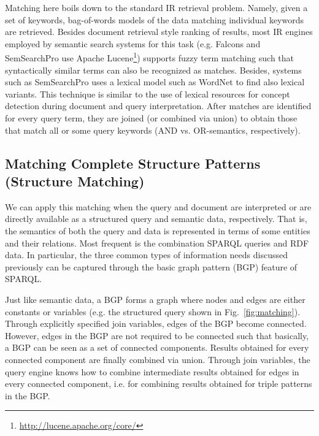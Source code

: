 Matching here boils down to the standard IR retrieval problem. Namely, given a set of keywords, bag-of-words models of the data matching individual keywords are retrieved. Besides document retrieval style ranking of results, most IR engines employed by semantic search systems for this task (e.g. Falcons and SemSearchPro use Apache Lucene\footnote{\url{http://lucene.apache.org/core/}}) supports fuzzy term matching such that syntactically similar terms can also be recognized as matches. Besides, systems such as SemSearchPro uses a lexical model such as WordNet to find also lexical variants. This technique is similar to the use of lexical resources for concept detection during document and query interpretation. After matches are identified for every query term, they are joined (or combined via union) to obtain those that match all or some query keywords (AND vs. OR-semantics, respectively).
 

\subsection{Matching Complete Structure Patterns (Structure Matching)} 
	 We can apply this matching when the query and document are interpreted or are directly available as a structured query and semantic data, respectively. That is, the semantics of both the query and data is represented in terms of some entities and their relations. Most frequent is the combination SPARQL queries and RDF data. In particular, the three common types of information needs discussed previously can be captured through the basic graph pattern (BGP) feature of SPARQL. 
	
	Just like semantic data, a BGP forms a graph where nodes and edges are either constants or variables (e.g. the structured query shown in Fig.~\ref{fig:matching}). Through explicitly specified join variables, edges of the BGP become connected. However, edges in the BGP are not required to be connected such that basically, a BGP can be seen as a set of connected components. Results obtained for every connected component are finally combined via union. Through join variables, the query engine knows how to combine intermediate results obtained for edges in every connected component, i.e. for combining results obtained for triple patterns in the BGP. 
	
